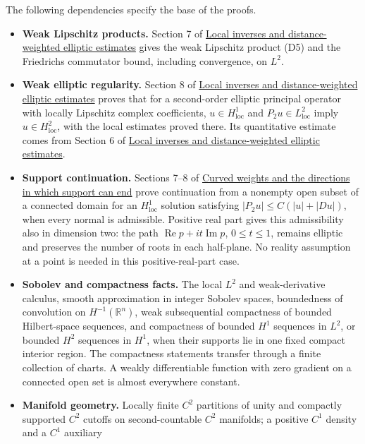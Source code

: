 \documentclass[
  11pt,
]{article}
\providecommand{\tightlist}{%
  \setlength{\itemsep}{0pt}\setlength{\parskip}{0pt}}
\begin{document}
The following dependencies specify the base of the proofs.

\begin{itemize}
\tightlist
\item
  \textbf{Weak Lipschitz products.} Section 7 of
  \href{local-elliptic-coefficients.pdf}{Local inverses and
  distance-weighted elliptic estimates} gives the weak Lipschitz product
  (D5) and the Friedrichs commutator bound, including convergence, on
  \(L^2\).
\item
  \textbf{Weak elliptic regularity.} Section 8 of
  \href{local-elliptic-coefficients.pdf}{Local inverses and
  distance-weighted elliptic estimates} proves that for a second-order
  elliptic principal operator with locally Lipschitz complex
  coefficients, \(u\in H^1_{\mathrm{loc}}\) and
  \(P_2u\in L^2_{\mathrm{loc}}\) imply \(u\in H^2_{\mathrm{loc}}\), with
  the local estimates proved there. Its quantitative estimate comes from
  Section 6 of \href{local-elliptic-coefficients.pdf}{Local inverses and
  distance-weighted elliptic estimates}.
\item
  \textbf{Support continuation.} Sections 7--8 of
  \href{support-continuation.pdf}{Curved weights and the directions in
  which support can end} prove continuation from a nonempty open subset
  of a connected domain for an \(H^1_{\mathrm{loc}}\) solution
  satisfying \(|P_2u|\leq C(|u|+|Du|)\), when every normal is
  admissible. Positive real part gives this admissibility also in
  dimension two: the path \(\operatorname{Re}p+it\operatorname{Im}p\),
  \(0\leq t\leq1\), remains elliptic and preserves the number of roots
  in each half-plane. No reality assumption at a point is needed in this
  positive-real-part case.
\item
  \textbf{Sobolev and compactness facts.} The local \(L^2\) and
  weak-derivative calculus, smooth approximation in integer Sobolev
  spaces, boundedness of convolution on \(H^{-1}(\mathbb R^n)\), weak
  subsequential compactness of bounded Hilbert-space sequences, and
  compactness of bounded \(H^1\) sequences in \(L^2\), or bounded
  \(H^2\) sequences in \(H^1\), when their supports lie in one fixed
  compact interior region. The compactness statements transfer through a
  finite collection of charts. A weakly differentiable function with
  zero gradient on a connected open set is almost everywhere constant.
\item
  \textbf{Manifold geometry.} Locally finite \(C^2\) partitions of unity
  and compactly supported \(C^2\) cutoffs on second-countable \(C^2\)
  manifolds; a positive \(C^1\) density and a \(C^1\) auxiliary

\end{itemize}
\end{document}
